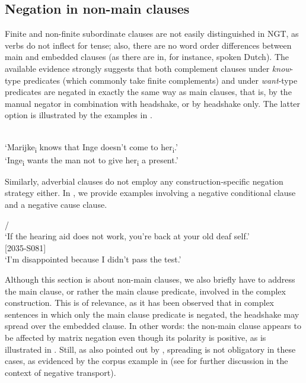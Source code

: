 \documentclass[output=paper,colorlinks,citecolor=brown]{langscibook}
\begin{document}
\subsection{Negation in non-main clauses} \label{subsec:ngt:neg-non-main}
\largerpage
Finite and non-finite subordinate clauses are not easily distinguished in NGT, as verbs do not inflect for tense; also, there are no word order differences between main and embedded clauses (as there are in, for instance, spoken Dutch). The available evidence strongly suggests that both complement clauses under \textit{know}-type predicates (which commonly take finite complements) and under \textit{want}-type predicates \citep[which commonly take non-finite complements;][]{Noonan2007} are negated in exactly the same way as main clauses, that is, by the manual negator in combination with headshake, or by headshake only. The latter option is illustrated by the examples in . 

\ea\label{ex:ngt:compl-clause}
    \ea\label{ex:ngt:compl-clause1}   \\ `Marijke\textsubscript{i} knows that Inge doesn't come to her\textsubscript{i}.' 
    \ex\label{ex:ngt:compl-clause2}   \\ `Inge\textsubscript{i} wants the man not to give her\textsubscript{i} a present.' \\ \hspace*{\fill} \citep[adapted from][123f]{Gijn2004}
    \z
\z

Similarly, adverbial clauses do not employ any construction-specific negation strategy either. In , we provide examples involving a negative conditional clause \citep[see also][]{Klomp2019} and a negative cause clause.

\ea\label{ex:ngt:adv-clause}
    \ea\label{ex:ngt:adv-clause1}    /  \\ `If the hearing aid does not work, you're back at your old deaf self.' \\ \hspace*{\fill} [2035-S081]
    \ex\label{ex:ngt:adv-clause2}   \\ `I'm disappointed because I didn't pass the test.'
    \z
\z

Although this section is about non-main clauses, we also briefly have to address the main clause, or rather the main clause predicate, involved in the complex construction. This is of relevance, as it has been observed that in complex sentences in which only the main clause predicate is negated, the headshake may spread over the embedded clause. In other words: the non-main clause appears to be affected by matrix negation even though its polarity is positive, as is illustrated in . Still, as also pointed out by \citet{Gijn2004}, spreading is not obligatory in these cases, as evidenced by the corpus example in  (see  for further discussion in the context of negative transport).
\end{document}
